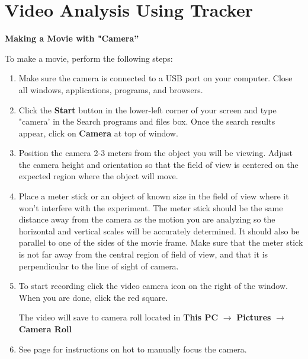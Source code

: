 
\section{Video Analysis Using Tracker}
\label{tracker}


\textbf{Making a Movie with "Camera''} 

To make a movie, perform the following steps:

\begin{enumerate}

\item Make sure the camera is connected to a USB port on your computer. 
Close all windows, applications, programs, and browsers.

\item Click the {\bf Start} button in the lower-left corner of your screen and 
type "camera' in the Search programs and files box. 
Once the search results appear, click on {\bf Camera} at top of window.


\item Position the camera 2-3 meters from the object you will be viewing. 
Adjust the camera height and orientation so that the field of view is 
centered on the expected region where the object will move. 

\item Place a meter stick or an object of known size in the field of view where 
it won't interfere with the experiment. 
The meter stick should be the same distance away from the camera as the motion 
you are analyzing so the horizontal and vertical scales will be accurately determined. 
It should also be parallel to one of the sides of the movie frame. 
Make sure that the meter stick is not far away from the central region of field of view, and that it is perpendicular to the line of sight of camera.

\item To start recording click the video camera icon on the right of the window. When you are done, click the red square. 

The video will save to camera roll located in {\bf This PC} $\rightarrow$ {\bf Pictures} $\rightarrow$ {\bf Camera Roll}

\item See page \pageref{manual_focus} for instructions on hot to manually focus the camera.

\end{enumerate}

